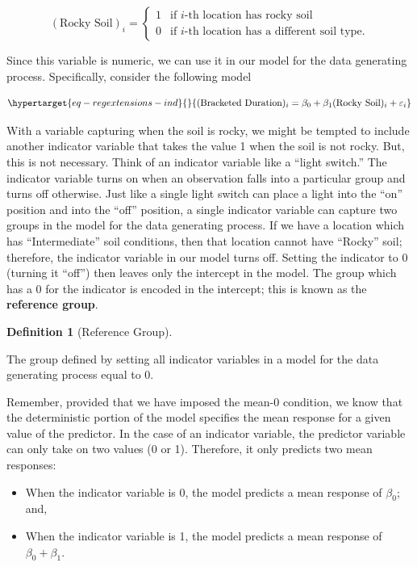 \documentclass[
  letterpaper,
  DIV=11,
  numbers=noendperiod]{scrreprt}
\providecommand{\tightlist}{%
  \setlength{\itemsep}{0pt}\setlength{\parskip}{0pt}}\usepackage{longtable,booktabs,array}
\theoremstyle{plain}
\theoremstyle{definition}
\theoremstyle{definition}
\newtheorem{definition}{Definition}[chapter]
\theoremstyle{remark}
\begin{document}
\[
(\text{Rocky Soil})_i = \begin{cases} 1 & \text{if } i\text{-th location has rocky soil} \\
0 & \text{if } i\text{-th location has a different soil type}. \end{cases}
\]

Since this variable is numeric, we can use it in our model for the data
generating process. Specifically, consider the following model

\begin{equation}\protect\hypertarget{eq-regextensions-ind}{}{(\text{Bracketed Duration})_i = \beta_0 + \beta_1 (\text{Rocky Soil})_i + \varepsilon_i}\label{eq-regextensions-ind}\end{equation}

With a variable capturing when the soil is rocky, we might be tempted to
include another indicator variable that takes the value 1 when the soil
is not rocky. But, this is not necessary. Think of an indicator variable
like a ``light switch.'' The indicator variable turns on when an
observation falls into a particular group and turns off otherwise. Just
like a single light switch can place a light into the ``on'' position
and into the ``off'' position, a single indicator variable can capture
two groups in the model for the data generating process. If we have a
location which has ``Intermediate'' soil conditions, then that location
cannot have ``Rocky'' soil; therefore, the indicator variable in our
model turns off. Setting the indicator to 0 (turning it ``off'') then
leaves only the intercept in the model. The group which has a 0 for the
indicator is encoded in the intercept; this is known as the
\textbf{reference group}.

\begin{definition}[Reference
Group]\protect\hypertarget{def-reference-group}{}\label{def-reference-group}

The group defined by setting all indicator variables in a model for the
data generating process equal to 0.

\end{definition}

Remember, provided that we have imposed the mean-0 condition, we know
that the deterministic portion of the model specifies the mean response
for a given value of the predictor. In the case of an indicator
variable, the predictor variable can only take on two values (0 or 1).
Therefore, it only predicts two mean responses:

\begin{itemize}
\tightlist
\item
  When the indicator variable is 0, the model predicts a mean response
  of \(\beta_0\); and,
\item
  When the indicator variable is 1, the model predicts a mean response
  of \(\beta_0 + \beta_1\).
\end{itemize}
\end{document}
